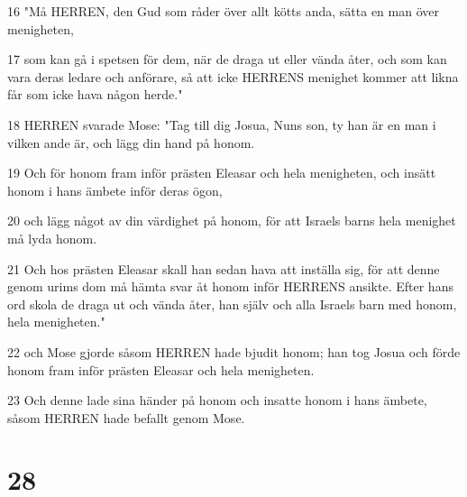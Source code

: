 \par 16 "Må HERREN, den Gud som råder över allt kötts anda, sätta en man över menigheten,
\par 17 som kan gå i spetsen för dem, när de draga ut eller vända åter, och som kan vara deras ledare och anförare, så att icke HERRENS menighet kommer att likna får som icke hava någon herde."
\par 18 HERREN svarade Mose: "Tag till dig Josua, Nuns son, ty han är en man i vilken ande är, och lägg din hand på honom.
\par 19 Och för honom fram inför prästen Eleasar och hela menigheten, och insätt honom i hans ämbete inför deras ögon,
\par 20 och lägg något av din värdighet på honom, för att Israels barns hela menighet må lyda honom.
\par 21 Och hos prästen Eleasar skall han sedan hava att inställa sig, för att denne genom urims dom må hämta svar åt honom inför HERRENS ansikte. Efter hans ord skola de draga ut och vända åter, han själv och alla Israels barn med honom, hela menigheten."
\par 22 och Mose gjorde såsom HERREN hade bjudit honom; han tog Josua och förde honom fram inför prästen Eleasar och hela menigheten.
\par 23 Och denne lade sina händer på honom och insatte honom i hans ämbete, såsom HERREN hade befallt genom Mose.

\chapter{28}

